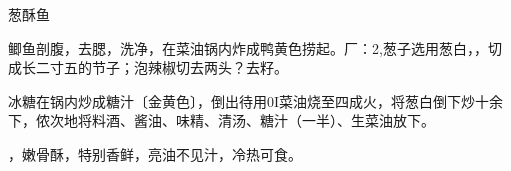 \begin{recipe}{葱酥鱼}

\ingredients


\cooking

\step 鲫鱼剖腹，去腮，洗净，在菜油锅内炸成鸭黄色捞起。厂：2,葱子选用葱白，，切
成长二寸五的节子；泡辣椒切去两头？去籽。

\step 冰糖在锅内炒成糖汁〔金黄色〕，倒出待用0I菜油烧至四成火，将葱白倒下炒十余
下，侬次地将料酒、酱油、味精、清汤、糖汁（一半）、生菜油放下。

\features

，嫩骨酥，特别香鲜，亮油不见汁，冷热可食。

\end{recipe}

